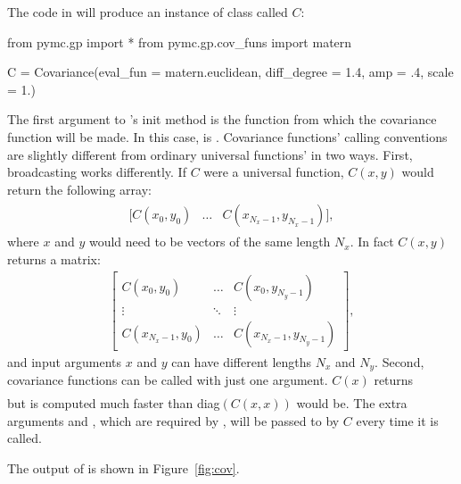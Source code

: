 \documentclass[article]{jss}
\begin{document}
The code in  will produce an instance of class  called $C$:
\begin{CodeChunk}
\begin{CodeInput}
from pymc.gp import *
from pymc.gp.cov_funs import matern

C = Covariance(eval_fun = matern.euclidean, diff_degree = 1.4, amp = .4, scale = 1.)
\end{CodeInput}
\end{CodeChunk}

The first argument to 's init method is the  function from which the covariance function will be made. In this case,  is . Covariance functions' calling conventions are slightly different from ordinary  universal functions' \citep{numpybook} in two ways. First, broadcasting works differently. If $C$ were a  universal function, $C(x,y)$ would return the following array:
    \begin{eqnarray*}
        \begin{array}{ccc}
            [C(x_0,y_0)& \ldots& C(x_{N_x-1},y_{N_x-1})],
        \end{array}
    \end{eqnarray*}
    where $x$ and $y$ would need to be vectors of the same length $N_x$. In fact $C(x,y)$ returns a matrix:
    \begin{eqnarray*}
        \left[\begin{array}{ccc}
            C(x_0,y_0)& \ldots& C(x_0,y_{N_y-1})\\
            \vdots&\ddots&\vdots\\
            C(x_{N_x-1},y_0)& \ldots& C(x_{N_x-1},y_{N_y-1})
        \end{array}\right],
    \end{eqnarray*}
    and input arguments $x$ and $y$ can have different lengths $N_x$ and $N_y$. Second, covariance functions can be called with just one argument. $C(x)$ returns
    \begin{eqnarray*}
         [C(x_0,x_0)& \ldots& C(x_{N_x-1},x_{N_x-1})]
    \end{eqnarray*}
    but is computed much faster than diag$(C(x,x))$ would be.
The extra arguments  and , which are required by , will be passed to  by $C$ every time it is called.
 
The output of  is shown in Figure~\ref{fig:cov}.
\end{document}
